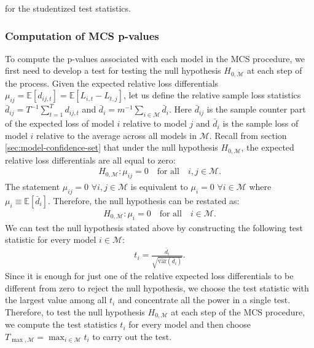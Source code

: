 \documentclass{article} %
\begin{document}
	for the studentized test statistics. 
	
	\subsubsection{Computation of MCS p-values}
	To compute the p-values associated with each model in the MCS procedure, we first need to develop a test for testing the null hypothesis $H_{0,\mathcal{M}}$ at each step of the process. Given the expected relative loss differentials $\mu_{ij} = \mathbb{E}[d_{ij,t}] = \mathbb{E}[L_{i,t} - L_{t,j}]$, let us define the relative sample loss statistics $\bar{d}_{ij} = T^{-1} \sum_{t=1}^T d_{ij,t}$ and $\bar{d}_i = m^{-1} \sum_{i \in \mathcal{M}} \bar{d}_i$. Here $\bar{d}_{ij}$ is the sample counter part of the expected loss of model $i$ relative to model $j$ and $\bar{d}_i$ is the sample loss of model $i$ relative to the average across all models in $\mathcal{M}$. Recall from section \ref{sec:model-confidence-set} that under the null hypothesis $H_{0,\mathcal{M}}$, the expected relative loss differentials are all equal to zero:
	\begin{align}
		H_{0,\mathcal{M}}: \mu_{ij} = 0 \quad \text{for all} \quad i,j \in \mathcal{M}.
	\end{align}
	The statement $\mu_{ij} = 0 \,\, \forall i,j \in \mathcal{M}$ is equivalent to $\mu_i = 0 \,\, \forall i \in \mathcal{M}$ where $\mu_i \equiv \mathbb{E}[\bar{d}_i]$. Therefore, the null hypothesis can be restated as:
	\begin{align}
		H_{0,\mathcal{M}}: \mu_i = 0 \quad \text{for all} \quad i \in \mathcal{M}.
	\end{align} 
	We can test the null hypothesis stated above by constructing the following test statistic for every model $i \in \mathcal{M}$:
	\begin{align}
		t_i = \frac{\bar{d}_{i}}{ \sqrt{\widehat{\text{var}}\left(\bar{d}_i\right) } }.
	\end{align}
	Since it is enough for just one of the relative expected loss differentials to be different from zero to reject the null hypothesis, we choose the test statistic with the largest value among all $t_i$ and concentrate all the power in a single test. Therefore, to test the null hypothesis $H_{0,\mathcal{M}}$ at each step of the MCS procedure, we compute the test statistics $t_i$ for every model and then choose $T_{\max , \mathcal{M}} = \max_{i \in \mathcal{M}}t_i$ to carry out the test.
	
\end{document}
